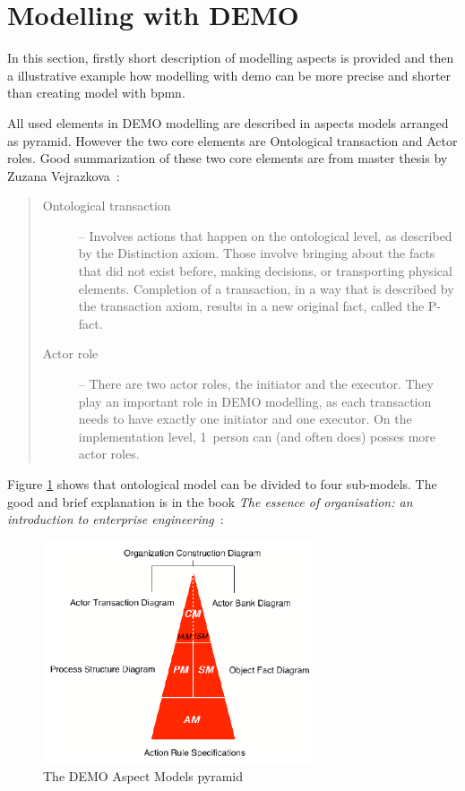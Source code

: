 \section{Modelling with DEMO}
In this section, firstly short description of modelling aspects is provided and then a illustrative example how modelling with \gls{demo} can be more precise and shorter than creating model with \gls{bpmn}. 

All used elements in DEMO modelling are described in aspects models arranged as pyramid. However the two core elements are Ontological transaction and Actor roles. Good summarization of these two core elements are from master thesis by Zuzana Vejrazkova~\cite{vejrazkova-demo-2013}:

\begin{quote}
	\begin{description}
		\item[Ontological transaction] -- Involves actions that happen on the ontological level, as described by the Distinction axiom. Those involve bringing about the facts that did not exist before, making decisions, or transporting physical elements. Completion of a transaction, in a way that is described by the transaction axiom, results in a new original fact, called the P-fact.
        \item[Actor role] -- There are two actor roles, the initiator and the executor. They play an important role in DEMO modelling, as each transaction needs to have exactly one initiator and one executor. On the implementation level, 1~person can (and often does) posses more actor roles.
	\end{description}
\end{quote}

Figure \ref{fig:DemoAspectModels} shows that ontological model can be divided to four sub-models. The good and brief explanation is in the book \textit{The essence of organisation: an introduction to enterprise engineering}~\cite{dietz-essence-2015}:

\begin{figure}[ht!]
	\centering
    \includegraphics[width=8cm, keepaspectratio]{img/DemoAspectModels}
    \caption{The DEMO Aspect Models pyramid\cite{dietz-discipline-2013}}
    \label{fig:DemoAspectModels}
\end{figure}

